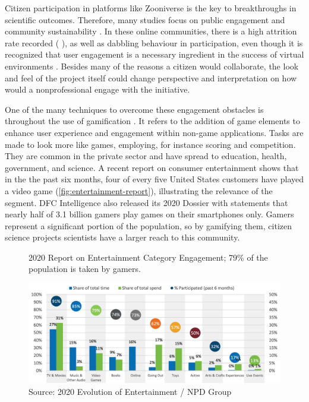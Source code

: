 Citizen participation in platforms like Zooniverse is the key to breakthroughs in scientific outcomes. Therefore, many studies focus on public engagement and community sustainability \cite{aristeidou2017profiles}. In these online communities, there is a high attrition rate recorded (\cite{nov2011technology} \cite{ponciano2015finding}), as well as dabbling behaviour \cite{eveleigh2014designing} in participation, even though it is recognized that user engagement is a necessary ingredient in the success of virtual environments \cite{verhagen2015benefitting}. Besides many of the reasons a citizen would collaborate, the look and feel of the project itself could change perspective and interpretation on how would a nonprofessional engage with the initiative.

One of the many techniques to overcome these engagement obstacles is throughout the use of gamification \cite{bowser2013using}. It refers to the addition of game elements to enhance user experience and engagement within non-game applications. Tasks are made to look more like games, employing, for instance scoring and competition. They are common in the private sector and have spread to education, health, government, and science. A recent report on consumer entertainment shows that in the the past six months, four of every five United States customers have played a video game (\autoref{fig:entertainment-report}), illustrating the relevance of the segment. DFC Intelligence also released its 2020 Dossier with statements that nearly half of 3.1 billion gamers play games on their smartphones only. Gamers represent a significant portion of the population, so by gamifying them, citizen science projects scientists have a larger reach to this community.

\begin{figure}[ht]
    \centering
    \caption{2020 Report on Entertainment Category Engagement; 79\% of the population is taken by gamers.}
    \includegraphics[width=\linewidth]{images/game.png}
    \caption*{Source: 2020 Evolution of Entertainment / NPD Group}
    \label{fig:entertainment-report}
\end{figure}

